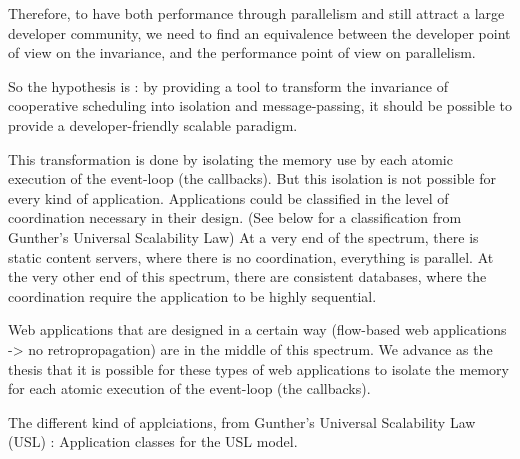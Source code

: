 Therefore, to have both performance through parallelism and still attract a large developer community, we need to find an equivalence between the developer point of view on the invariance, and the performance point of view on parallelism.

So the hypothesis is : by providing a tool to transform the invariance of cooperative scheduling into isolation and message-passing, it should be possible to provide a developer-friendly scalable paradigm.

This transformation is done by isolating the memory use by each atomic execution of the event-loop (the callbacks).
But this isolation is not possible for every kind of application.
Applications could be classified in the level of coordination necessary in their design. (See below for a classification from Gunther's Universal Scalability Law)
At a very end of the spectrum, there is static content servers, where there is no coordination, everything is parallel.
At the very other end of this spectrum, there are consistent databases, where the coordination require the application to be highly sequential.

Web applications that are designed in a certain way (flow-based web applications -> no retropropagation) are in the middle of this spectrum.
We advance as the thesis that it is possible for these types of web applications to isolate the memory for each atomic execution of the event-loop (the callbacks).



The different kind of applciations, from Gunther's Universal Scalability Law (USL) :
Application classes for the USL model.

